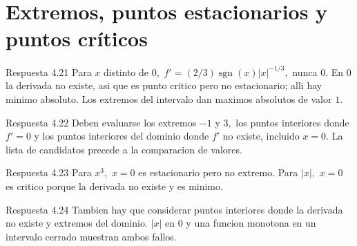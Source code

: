 \documentclass[10pt,a4paper,oneside,openany]{book}
\begin{document}
\section{Extremos, puntos estacionarios y puntos críticos}
\begin{PSevenAnswerFixed}{Respuesta 4.21}
Para \(x\) distinto de \(0,\) \(f'=(2/3)\operatorname{sgn}(x)|x|^{-1/3},\) nunca \(0\). En \(0\) la derivada no existe, asi que es punto critico pero no estacionario; alli hay minimo absoluto. Los extremos del intervalo dan maximos absolutos de valor \(1\).
\end{PSevenAnswerFixed}
\begin{PSevenAnswerFixed}{Respuesta 4.22}
Deben evaluarse los extremos \(-1\) y \(3,\) los puntos interiores donde \(f'=0\) y los puntos interiores del dominio donde \(f'\) no existe, incluido \(x=0\). La lista de candidatos precede a la comparacion de valores.
\end{PSevenAnswerFixed}
\begin{PSevenAnswerFixed}{Respuesta 4.23}
Para \(x^{3},\) \(x=0\) es estacionario pero no extremo. Para \(|x|,\) \(x=0\) es critico porque la derivada no existe y es minimo.
\end{PSevenAnswerFixed}
\begin{PSevenAnswerFixed}{Respuesta 4.24}
Tambien hay que considerar puntos interiores donde la derivada no existe y extremos del dominio. \(|x|\) en \(0\) y una funcion monotona en un intervalo cerrado muestran ambos fallos.
\end{PSevenAnswerFixed}
\end{document}
